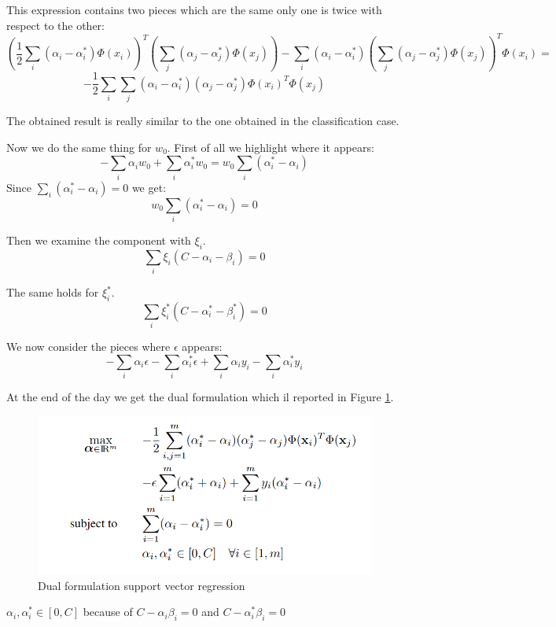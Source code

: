 This expression contains two pieces which are the same only one is twice with respect to the other:
$$(\frac{1}{2}\sum_i (\alpha_i - \alpha_i^*) \Phi(x_i))^T (\sum_j (\alpha_j - \alpha_j^*) \Phi(x_j)) - \sum_i(\alpha_i - \alpha_i^*) (\sum_j (\alpha_j - \alpha_j^*) \Phi(x_j))^T \Phi(x_i) = $$
$$-\frac{1}{2} \sum_i \sum_j (\alpha_i - \alpha_i^*) (\alpha_j - \alpha_j^*) \Phi(x_i)^T \Phi(x_j)$$

The obtained result is really similar to the one obtained in the classification case. \newline

Now we do the same thing for $w_0$. First of all we highlight where it appears:
$$- \sum_i \alpha_i w_0 + \sum_i \alpha_i^* w_0 = w_0 \sum_i (\alpha_i^* - \alpha_i)$$
Since $\sum_i (\alpha_i^* - \alpha_i) = 0$ we get:
$$w_0 \sum_i (\alpha_i^* - \alpha_i) = 0$$

Then we examine the component with $\xi_i$.
$$\sum_i \xi_i (C - \alpha_i - \beta_i) = 0$$

The same holds for $\xi_i^*$.
$$\sum_i \xi_i^* (C - \alpha_i^* - \beta_i^*) = 0$$

We now consider the pieces where $\epsilon$ appears:
$$- \sum_i \alpha_i \epsilon - \sum_i \alpha_i^* \epsilon + \sum_i \alpha_i y_i - \sum_i \alpha_i^* y_i$$

At the end of the day we get the dual formulation which il reported in Figure \ref{fig:svm_regression_dual}.

\begin{figure}[ht]
    \centering
    \includegraphics[scale=0.4]{images/svm_regression_dualFormulation.png}
    \caption{Dual formulation support vector regression}
    \label{fig:svm_regression_dual}
\end{figure}

$\alpha_i, \alpha_i^* \in [0,C]$ because of $C - \alpha_i \beta_i = 0$ and $C - \alpha_i^* \beta_i = 0$ \newline

